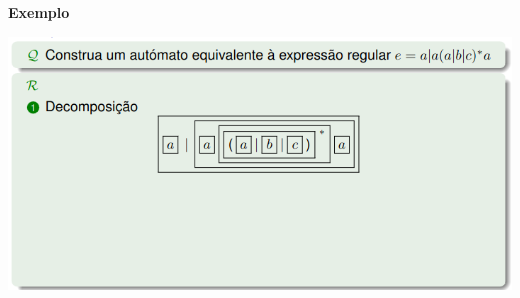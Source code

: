 \documentclass{article}
\begin{document}
\begin{flushleft}
  \textbf{Exemplo}

  \begin{center}
    \includegraphics[scale=0.4]{76}
  \end{center}


\end{flushleft}
\end{document}
